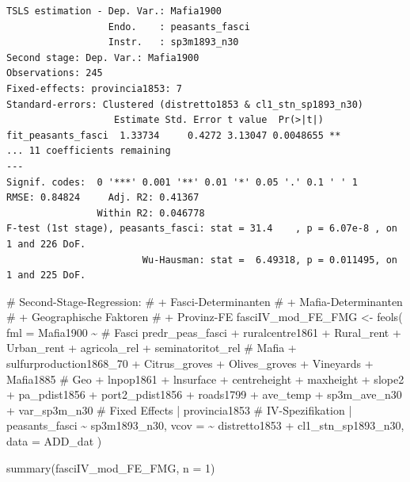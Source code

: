 \documentclass[
  a4paper,
  DIV=11,
  oneside]{scrreprt}
\newenvironment{Shaded}{\begin{snugshade}}{\end{snugshade}}
\newcommand{\AttributeTok}[1]{\textcolor[rgb]{0.40,0.45,0.13}{#1}}
\newcommand{\CommentTok}[1]{\textcolor[rgb]{0.37,0.37,0.37}{#1}}
\newcommand{\DecValTok}[1]{\textcolor[rgb]{0.68,0.00,0.00}{#1}}
\newcommand{\FunctionTok}[1]{\textcolor[rgb]{0.28,0.35,0.67}{#1}}
\newcommand{\NormalTok}[1]{\textcolor[rgb]{0.00,0.23,0.31}{#1}}
\newcommand{\OtherTok}[1]{\textcolor[rgb]{0.00,0.23,0.31}{#1}}
\newcommand{\SpecialCharTok}[1]{\textcolor[rgb]{0.37,0.37,0.37}{#1}}
\begin{document}
\begin{verbatim}
TSLS estimation - Dep. Var.: Mafia1900
                  Endo.    : peasants_fasci
                  Instr.   : sp3m1893_n30
Second stage: Dep. Var.: Mafia1900
Observations: 245
Fixed-effects: provincia1853: 7
Standard-errors: Clustered (distretto1853 & cl1_stn_sp1893_n30) 
                   Estimate Std. Error t value  Pr(>|t|)    
fit_peasants_fasci  1.33734     0.4272 3.13047 0.0048655 ** 
... 11 coefficients remaining
---
Signif. codes:  0 '***' 0.001 '**' 0.01 '*' 0.05 '.' 0.1 ' ' 1
RMSE: 0.84824     Adj. R2: 0.41367 
                Within R2: 0.046778
F-test (1st stage), peasants_fasci: stat = 31.4    , p = 6.07e-8 , on 1 and 226 DoF.
                        Wu-Hausman: stat =  6.49318, p = 0.011495, on 1 and 225 DoF.
\end{verbatim}

\begin{Shaded}
\begin{Highlighting}[]
\CommentTok{\# Second{-}Stage{-}Regression:}
\CommentTok{\# + Fasci{-}Determinanten}
\CommentTok{\# + Mafia{-}Determinanten}
\CommentTok{\# + Geographische Faktoren}
\CommentTok{\# + Provinz{-}FE}
\NormalTok{fasciIV\_mod\_FE\_FMG }\OtherTok{\textless{}{-}} \FunctionTok{feols}\NormalTok{(}
  \AttributeTok{fml =}\NormalTok{ Mafia1900 }\SpecialCharTok{\textasciitilde{}} 
    \CommentTok{\# Fasci}
\NormalTok{    predr\_peas\_fasci}
  \SpecialCharTok{+}\NormalTok{ ruralcentre1861}
  \SpecialCharTok{+}\NormalTok{ Rural\_rent}
  \SpecialCharTok{+}\NormalTok{ Urban\_rent}
  \SpecialCharTok{+}\NormalTok{ agricola\_rel}
  \SpecialCharTok{+}\NormalTok{ seminatoritot\_rel}
    \CommentTok{\# Mafia}
  \SpecialCharTok{+}\NormalTok{ sulfurproduction1868\_70}
  \SpecialCharTok{+}\NormalTok{ Citrus\_groves}
  \SpecialCharTok{+}\NormalTok{ Olives\_groves}
  \SpecialCharTok{+}\NormalTok{ Vineyards}
  \SpecialCharTok{+}\NormalTok{ Mafia1885}
    \CommentTok{\# Geo}
  \SpecialCharTok{+}\NormalTok{ lnpop1861}
  \SpecialCharTok{+}\NormalTok{ lnsurface}
  \SpecialCharTok{+}\NormalTok{ centreheight}
  \SpecialCharTok{+}\NormalTok{ maxheight}
  \SpecialCharTok{+}\NormalTok{ slope2}
  \SpecialCharTok{+}\NormalTok{ pa\_pdist1856}
  \SpecialCharTok{+}\NormalTok{ port2\_pdist1856}
  \SpecialCharTok{+}\NormalTok{ roads1799}
  \SpecialCharTok{+}\NormalTok{ ave\_temp}
  \SpecialCharTok{+}\NormalTok{ sp3m\_ave\_n30}
  \SpecialCharTok{+}\NormalTok{ var\_sp3m\_n30}
    \CommentTok{\# Fixed Effects}
  \SpecialCharTok{|}\NormalTok{ provincia1853 }
    \CommentTok{\# IV{-}Spezifikation}
  \SpecialCharTok{|}\NormalTok{ peasants\_fasci }\SpecialCharTok{\textasciitilde{}}\NormalTok{ sp3m1893\_n30,}
  \AttributeTok{vcov =} \SpecialCharTok{\textasciitilde{}}\NormalTok{ distretto1853 }\SpecialCharTok{+}\NormalTok{ cl1\_stn\_sp1893\_n30,}
  \AttributeTok{data =}\NormalTok{ ADD\_dat}
\NormalTok{)}

\FunctionTok{summary}\NormalTok{(fasciIV\_mod\_FE\_FMG, }\AttributeTok{n =} \DecValTok{1}\NormalTok{)}
\end{Highlighting}
\end{Shaded}
\end{document}
